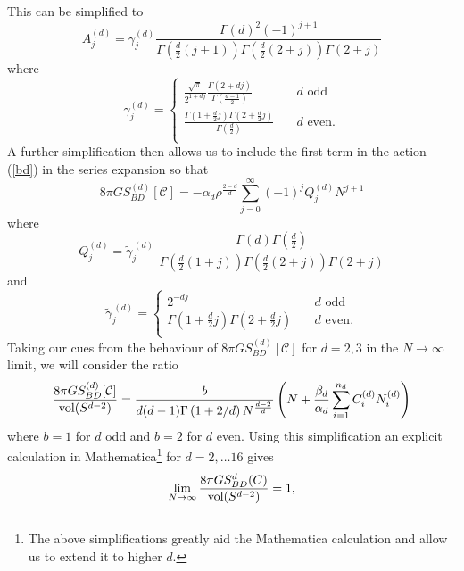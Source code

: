 \documentclass[12pt]{article}
\begin{document}
This can be simplified to 
\begin{equation}
A_j^{(d)}= \gamma_j^{ (d)}   \frac{\Gamma\left (d\right)^2 (-1)^{j+1}}{\Gamma\left (\frac{d}{2} (j + 1)\right) \Gamma\left (\frac{d}{2} (2 + j)\right) \Gamma\left (2 + j\right) }
\label{simplercoefft} 
\end{equation} 
where 
\begin{equation} \gamma_j^{ (d)}= 
\begin{cases} 
\displaystyle\frac{\sqrt{\pi}}{2^{1+dj} }\frac{\Gamma\left (2+dj\right)}{\Gamma\left (\frac{d-1}{2}\right)}    \quad   & d \, \, \mathrm{odd} \\
\displaystyle\frac{\Gamma\left (1+\frac{d}{2}j\right)  \Gamma\left (2+\frac{d}{2}j\right) }{\Gamma\left (\frac{d}{2}\right)}  \quad  & d\mathrm{ \, \,  even.} \\
\end{cases} 
\end{equation} 
A further simplification then allows us to include the first term in the action (\ref{bd}) in the series expansion so that 
\begin{equation} 
8 \pi G S_{BD}^{ (d)}[\mathcal C] = -\alpha_d \rho^{\frac{2-d}{d}} \sum_{j=0}^\infty (-1)^j Q_j^{ (d)} N^{j+1} 
\end{equation}
where 
\begin{equation} 
Q_j^{ (d)}  = {\widetilde \gamma}_j^{\, (d)} \, \, \frac{\Gamma\left (d\right)\Gamma\left (\frac{d}{2}\right)}{\Gamma\left (\frac{d}{2} (1+j)\right) \Gamma\left (\frac{d}{2} (2+j)\right) \Gamma\left (2+j\right)}
\label{fullcoefft} \end{equation}
and
\begin{equation}
{\widetilde \gamma}_j^{\, (d)} = 
\begin{cases} 
2^{-dj}    \quad   &{d} \, \, \mathrm{odd} \\
\Gamma\left (1+\frac{d}{2}j\right) \Gamma\left (2+\frac{d}{2}j\right)   \quad   &d\mathrm{ \, \,  even.} \\
\end{cases} 
\end{equation} 
Taking our cues from the behaviour of $8 \pi G S_{BD}^{ (d)}[\mathcal C]$ for $d=2,3$ in the  $N \rightarrow \infty$ limit,  we will consider the ratio
\begin{equation} 
\frac{ 8 \pi G S_{BD}^{ (d)}[\mathcal C]}{\mathrm{vol} (S^{d-2})} = \frac{b}{d (d-1) \Gamma\left (1+2/d\right) N^{\frac{d-2}{d}}} \left ( N + \frac{\beta_d}{\alpha_d} \sum_{i=1}^{n_d} C_i^{ (d)} N_i^{ (d)} \right)  
\label{ratio} 
\end{equation} 
where $b=1$ for $d$ odd and $b=2$ for $d$ even.
Using this simplification an explicit calculation in Mathematica\footnote{The above simplifications greatly aid the Mathematica calculation and allow us to extend it to higher $d$.}  for $d=2, \ldots 16$ gives 
\begin{equation} 
\lim_{N \rightarrow \infty} \frac{ 8 \pi G S_{BD}^d (C)}{\mathrm{vol} (S^{d-2})} = 1,  
\label{result} 
\end{equation} 
\end{document}
